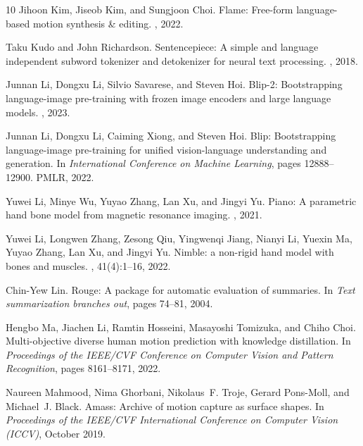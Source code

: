 \documentclass{article}
\begin{document}
{\begin{thebibliography}{10}
  Jihoon Kim, Jiseob Kim, and Sungjoon Choi.
  \newblock Flame: Free-form language-based motion synthesis \& editing.
  , 2022.
  
  Taku Kudo and John Richardson.
  \newblock Sentencepiece: A simple and language independent subword tokenizer
    and detokenizer for neural text processing.
  , 2018.
  
  Junnan Li, Dongxu Li, Silvio Savarese, and Steven Hoi.
  \newblock Blip-2: Bootstrapping language-image pre-training with frozen image
    encoders and large language models.
  , 2023.
  
  Junnan Li, Dongxu Li, Caiming Xiong, and Steven Hoi.
  \newblock Blip: Bootstrapping language-image pre-training for unified
    vision-language understanding and generation.
  \newblock In {\em International Conference on Machine Learning}, pages
    12888--12900. PMLR, 2022.
  
  Yuwei Li, Minye Wu, Yuyao Zhang, Lan Xu, and Jingyi Yu.
  \newblock Piano: A parametric hand bone model from magnetic resonance imaging.
  , 2021.
  
  Yuwei Li, Longwen Zhang, Zesong Qiu, Yingwenqi Jiang, Nianyi Li, Yuexin Ma,
    Yuyao Zhang, Lan Xu, and Jingyi Yu.
  \newblock Nimble: a non-rigid hand model with bones and muscles.
  , 41(4):1--16, 2022.
  
  Chin-Yew Lin.
  \newblock Rouge: A package for automatic evaluation of summaries.
  \newblock In {\em Text summarization branches out}, pages 74--81, 2004.
  
  Hengbo Ma, Jiachen Li, Ramtin Hosseini, Masayoshi Tomizuka, and Chiho Choi.
  \newblock Multi-objective diverse human motion prediction with knowledge
    distillation.
  \newblock In {\em Proceedings of the IEEE/CVF Conference on Computer Vision and
    Pattern Recognition}, pages 8161--8171, 2022.
  
  Naureen Mahmood, Nima Ghorbani, Nikolaus~F. Troje, Gerard Pons-Moll, and
    Michael~J. Black.
  \newblock Amass: Archive of motion capture as surface shapes.
  \newblock In {\em Proceedings of the IEEE/CVF International Conference on
    Computer Vision (ICCV)}, October 2019.
  

\end{thebibliography}}
\end{document}

